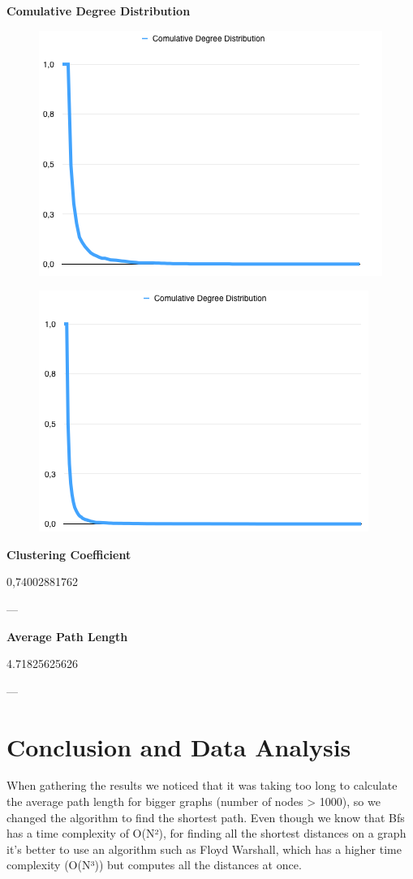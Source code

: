 \documentclass[a4paper,titlepage,11pt]{article}
\begin{document}
\textbf{Comulative Degree Distribution}

\begin{figure}[h]
    \centering
    \includegraphics[scale=0.50]{img/cdd-minimal-3-1000.png}
\end{figure}

\begin{figure}[h]
    \centering
    \includegraphics[scale=0.50]{img/cdd-minimal-3-5000.png}
\end{figure}

\textbf{Clustering Coefficient}

0,74002881762

---

\textbf{Average Path Length}

4.71825625626

---

\section{Conclusion and Data Analysis}
When gathering the results we noticed that it was taking too long to calculate the average path length for bigger graphs (number of nodes > 1000), so we changed the algorithm to find the shortest path. Even though we know that Bfs has a time complexity of O(N²), for finding all the shortest distances on a graph it's better to use an algorithm such as Floyd Warshall, which has a higher time complexity (O(N³)) but computes all the distances at once.
\end{document}
